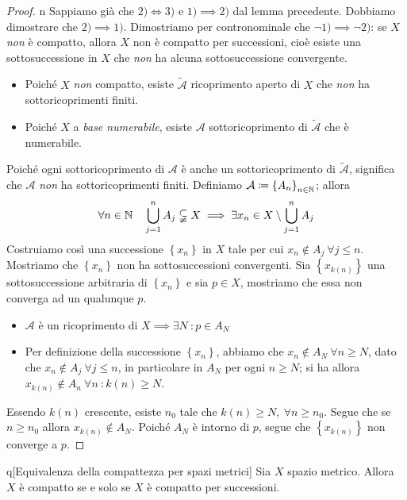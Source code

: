 \begin{proof}{n}
Sappiamo già che $2)\iff 3)$ e $1)\implies 2)$ dal lemma precedente. Dobbiamo dimostrare che $2)\implies 1)$. Dimostriamo per contronominale che $\neg 1)\implies \neg 2)$: se $X$ \textit{non} è compatto, allora $X$ non è compatto per successioni, cioè esiste una sottosuccessione in $X$ che \textit{non} ha alcuna sottosuccessione convergente.
\begin{itemize}
	\item Poiché $X$ \textit{non} compatto, esiste $\widetilde{\mathcal{A}}$ ricoprimento aperto di $X$ che \textit{non} ha sottoricoprimenti finiti.
	\item Poiché $X$ a \textit{base numerabile}, esiste $\mathcal{A}$ sottoricoprimento di $\widetilde{\mathcal{A}}$ che è numerabile.
\end{itemize}
Poiché ogni sottoricoprimento di $\mathcal{A}$ è anche un sottoricoprimento di $\widetilde{\mathcal{A}}$, significa che $\mathcal{A}$ \textit{non} ha sottoricoprimenti finiti. Definiamo $\mathcal{A}\coloneqq\left\{A_n\right\}_{n\in\mathbb{N}}$; allora
\begin{equation*}
\forall n\in\mathbb{N}\quad \bigcup_{j=1}^n A_j\subsetneqq X\implies \exists x_n\in X\setminus \bigcup_{j=1}^n A_j
\end{equation*}
Costruiamo così una successione $\left\{x_n\right\}$ in $X$ tale per cui $x_n\notin A_j\ \forall j\leq n$. Mostriamo che $\left\{x_n\right\}$ non ha sottosuccessioni convergenti. Sia $\left\{x_{k\left(n\right)}\right\}$ una sottosuccessione arbitraria di $\left\{x_n\right\}$ e sia $p\in X$, mostriamo che essa non converga ad un qualunque $p$.
\begin{itemize}
	\item $\mathcal{A}$ è un ricoprimento di $X\implies \exists N\ \colon p\in A_N$
	\item Per definizione della successione $\left\{x_n\right\}$, abbiamo che $x_n \notin A_N \ \forall n\geq N$, dato che $x_n \notin A_j \ \forall j\leq n$, in particolare in $A_N$ per ogni $n\geq N$; si ha allora $x_{k\left(n\right)}\notin A_n\ \forall n\ \colon k\left(n\right)\geq N$.
\end{itemize}
Essendo $k\left(n\right)$ crescente, esiste $n_0$ tale che $k\left(n\right)\geq N,\ \forall n\geq n_0$. Segue che se $n\geq n_0$ allora $x_{k\left(n\right)}\notin A_N$. Poiché $A_N$ è intorno di $p$, segue che $\left\{x_{k\left(n\right)}\right\}$ non converge a $p$.
\end{proof}
\begin{theorem}{q}[Equivalenza della compattezza per spazi metrici]
Sia $X$ spazio metrico. Allora $X$ è compatto se e solo se $X$ è compatto per successioni.\qedhere
\end{theorem}
